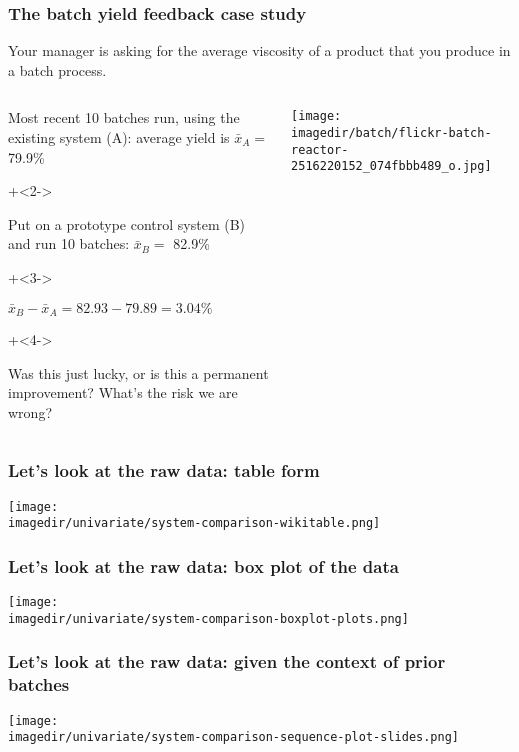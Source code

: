 \begin{frame}\frametitle{The batch yield feedback case study}
	Your manager is asking for the average viscosity of a product that you produce in a batch process. 
	
	\begin{columns}[T]
			
			\begin{itemize}
				\item	Most recent 10 batches run, using the existing system (A): average yield is $\bar{x}_A =$ {\color{blue}79.9\%}
				
				\vspace{18pt}
				\onslide+<2->{
					\item	Put on a prototype control system (B) and run 10 batches: $\bar{x}_B =$ {\color{blue}82.9\%}
				}
				\vspace{18pt}
				\onslide+<3->{
					\item	$\bar{x}_B - \bar{x}_A = 82.93 - 79.89 = 3.04\%$
				}
				\vspace{18pt}
				\onslide+<4->{
					\item	Was this just lucky, or is this a permanent improvement? What's the risk we are wrong?
				}
			\end{itemize}
			\centerline{\texttt{[image: \\imagedir/batch/flickr-batch-reactor-2516220152\_074fbbb489\_o.jpg]} }
	\end{columns}
\end{frame}

\begin{frame}\frametitle{Let's look at the raw data: table form}
	\texttt{[image: \\imagedir/univariate/system-comparison-wikitable.png]}
\end{frame}

\begin{frame}\frametitle{Let's look at the raw data: box plot of the data}
	\texttt{[image: \\imagedir/univariate/system-comparison-boxplot-plots.png]}
\end{frame}

\begin{frame}\frametitle{Let's look at the raw data: given the context of prior batches}
	\texttt{[image: \\imagedir/univariate/system-comparison-sequence-plot-slides.png]}
\end{frame}

